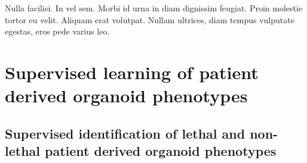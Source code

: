 \begin{savequote}[75mm]
Nulla facilisi. In vel sem. Morbi id urna in diam dignissim feugiat. Proin molestie tortor eu velit. Aliquam erat volutpat. Nullam ultrices, diam tempus vulputate egestas, eros pede varius leo.
\end{savequote}

\chapter{Supervised learning of patient derived organoid phenotypes}

\section{Supervised identification of lethal and non-lethal patient derived organoid phenotypes}

